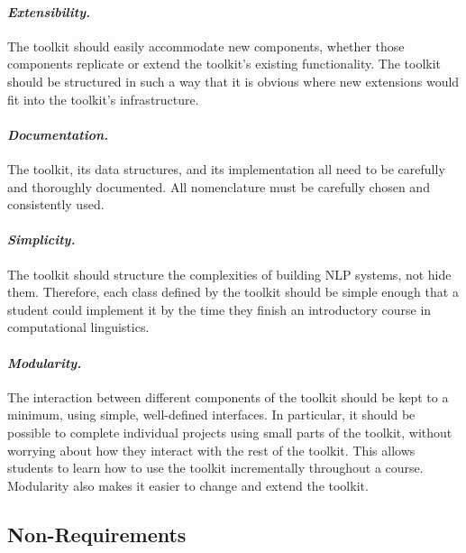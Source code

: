 \documentclass[11pt]{article}
\begin{document}
\paragraph{\textit{Extensibility.}} The toolkit should easily
accommodate new components, whether those components replicate or
extend the toolkit's existing functionality.  The toolkit should be
structured in such a way that it is obvious where new extensions would
fit into the toolkit's infrastructure.

\paragraph{\textit{Documentation.}} The toolkit, its data structures,
and its implementation all need to be carefully and thoroughly
documented.  
All nomenclature must be carefully chosen and consistently used.

\paragraph{\textit{Simplicity.}} The toolkit should structure the
complexities of building NLP systems, not hide them.  Therefore, each
class defined by the toolkit should be simple enough that a student
could implement it by the time they finish an introductory course in
computational linguistics.

\paragraph{\textit{Modularity.}} The interaction between different
components of the toolkit should be kept to a minimum, using simple,
well-defined interfaces.  In particular, it should be possible to
complete individual projects using small parts of the toolkit, without
worrying about how they interact with the rest of the toolkit.  This
allows students to learn how to use the toolkit incrementally
throughout a course.  Modularity also makes it easier to change and
extend the toolkit.

\subsection{Non-Requirements}
\end{document}
